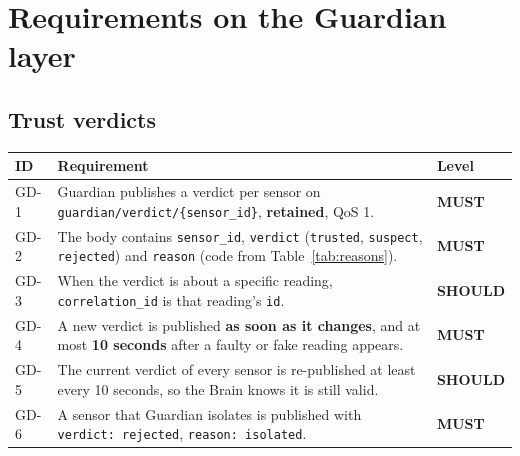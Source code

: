 \documentclass[11pt,a4paper]{article}
\newcommand{\code}[1]{\texttt{#1}}
\newcommand{\MUST}{\textbf{\textcolor{must}{MUST}}}
\newcommand{\SHOULD}{\textbf{\textcolor{should}{SHOULD}}}
\begin{document}
\section{Requirements on the Guardian layer}

\subsection{Trust verdicts}

\begin{longtable}{@{}l p{10.9cm} l@{}}
\toprule
\textbf{ID} & \textbf{Requirement} & \textbf{Level} \\
\midrule
\endhead
GD-1 & Guardian publishes a verdict per sensor on \code{guardian/\allowbreak verdict/\allowbreak \{sensor\_id\}}, \textbf{retained}, QoS 1. & \MUST \\
GD-2 & The body contains \code{sensor\_id}, \code{verdict} (\code{trusted}, \code{suspect}, \code{rejected}) and \code{reason} (code from Table~\ref{tab:reasons}). & \MUST \\
GD-3 & When the verdict is about a specific reading, \code{correlation\_id} is that reading's \code{id}. & \SHOULD \\
GD-4 & A new verdict is published \textbf{as soon as it changes}, and at most \textbf{10 seconds} after a faulty or fake reading appears. & \MUST \\
GD-5 & The current verdict of every sensor is re-published at least every 10 seconds, so the Brain knows it is still valid. & \SHOULD \\
GD-6 & A sensor that Guardian isolates is published with \code{verdict: rejected}, \code{reason: isolated}. & \MUST \\
\bottomrule
\end{longtable}
\end{document}
